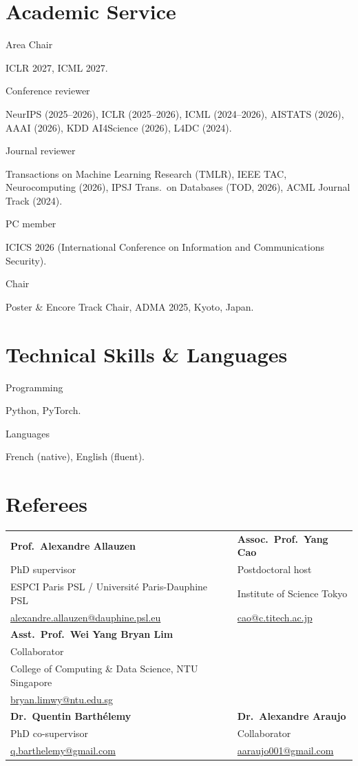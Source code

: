 \documentclass[10pt,a4paper]{article}
\newcommand{\cv}[2]{%
  \noindent\begin{minipage}[t]{0.135\textwidth}%
    \strut\raggedright\small\color{dategray} #1%
  \end{minipage}%
  \hspace{0.015\textwidth}%
  \begin{minipage}[t]{0.845\textwidth}%
    \strut #2%
  \end{minipage}\par\vspace{5pt}%
}
\begin{document}
\section{Academic Service}
\cv{Area Chair}{ICLR 2027, ICML 2027.}
\cv{Conference reviewer}{NeurIPS (2025–2026), ICLR (2025–2026), ICML (2024–2026), AISTATS (2026), AAAI (2026), KDD AI4Science (2026), L4DC (2024).}
\cv{Journal reviewer}{Transactions on Machine Learning Research (TMLR), IEEE TAC, Neurocomputing (2026), IPSJ Trans.\ on Databases (TOD, 2026), ACML Journal Track (2024).}
\cv{PC member}{ICICS 2026 (International Conference on Information and Communications Security).}
\cv{Chair}{Poster \& Encore Track Chair, ADMA 2025, Kyoto, Japan.}

\section{Technical Skills \& Languages}
\cv{Programming}{Python, PyTorch.}
\cv{Languages}{French (native), English (fluent).}

\section{Referees}
\begin{tabularx}{\textwidth}{@{}XX@{}}
    \textbf{Prof.\ Alexandre Allauzen}                & \textbf{Assoc.\ Prof.\ Yang Cao}                     \\
    PhD supervisor                                    & Postdoctoral host                                    \\
    ESPCI Paris PSL / Université Paris-Dauphine PSL   & Institute of Science Tokyo                           \\
    \href{mailto:alexandre.allauzen@dauphine.psl.eu}{alexandre.allauzen@dauphine.psl.eu} & \href{mailto:cao@c.titech.ac.jp}{cao@c.titech.ac.jp} \\[8pt]
    \textbf{Asst.\ Prof.\ Wei Yang Bryan Lim}         & \\
    Collaborator                                      & \\
    College of Computing \& Data Science, NTU Singapore & \\
    \href{mailto:bryan.limwy@ntu.edu.sg}{bryan.limwy@ntu.edu.sg} & \\[8pt]
    \textbf{Dr.\ Quentin Barthélemy}                  & \textbf{Dr.\ Alexandre Araujo}                       \\
    PhD co-supervisor                                 & Collaborator                                         \\
    \href{mailto:q.barthelemy@gmail.com}{q.barthelemy@gmail.com} & \href{mailto:aaraujo001@gmail.com}{aaraujo001@gmail.com}    \\
\end{tabularx}
\end{document}
